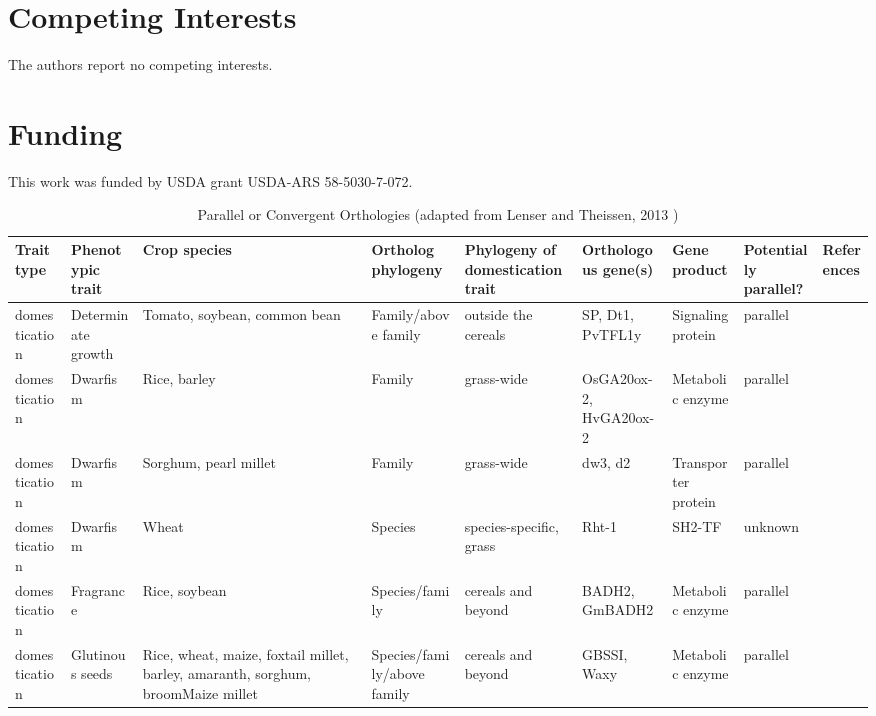\documentclass[12pt]{article}
\begin{document}
\section*{Competing Interests}
The authors report no competing interests.

\section*{Funding}
This work was funded by USDA grant USDA-ARS 58-5030-7-072.




\begin{table}
\begin{center}
\caption{Parallel or Convergent Orthologies (adapted from Lenser and Theissen, 2013 \citep{Lenser2013})} \label{tab:Ortho}
\fontsize{7}{8}\selectfont
\begin{tabular}{C{1.5cm}G{2.5cm}C{3.10cm}C{3.2cm}C{2.3cm}G{3.5cm}G{2.1cm}C{1.3cm}G{1.5cm}}
\\\toprule
{\bf Trait type} & {\bf Phenotypic trait} &{\bf Crop species} & {\bf Ortholog phylogeny} & {\bf Phylogeny of domestication trait} & {\bf Orthologous gene(s)} & {\bf Gene product} & {\bf Potentially parallel?} & {\bf References} \\\toprule
 domestication & Determinate growth &Tomato, soybean, common bean & Family/above family & outside the cereals & SP, Dt1, PvTFL1y & Signaling protein & parallel & \citep{Doebley2006, Repinski2012, Liu2010, Kwak2012, Tian2010}\\
 domestication & Dwarfism &Rice, barley & Family & grass-wide & OsGA20ox-2, HvGA20ox-2 & Metabolic enzyme & parallel & \citep{Asano2007, Asano2011, Jia2009}\\
 domestication & Dwarfism &Sorghum, pearl millet & Family & grass-wide & dw3, d2 & Transporter protein & parallel & \citep{Multani2003,Parvathaneni2013}\\
 domestication & Dwarfism &Wheat & Species & species-specific, grass & Rht-1 & SH2-TF & unknown & \citep{Doebley2006}\\
 domestication & Fragrance &Rice, soybean & Species/family & cereals and beyond & BADH2, GmBADH2 & Metabolic enzyme & parallel & \citep{Kovach2009, Juwattanasomran2010}\\
 domestication & Glutinous seeds &Rice, wheat, maize, foxtail millet, barley, amaranth, sorghum, broomMaize millet & Species/family/above family & cereals and beyond & GBSSI, Waxy & Metabolic enzyme & parallel & \cite{Jeon2010, Fan2008, Kawahigashi2013, Kawase2005, Hunt2012, Park2011}\\

\end{tabular}
\end{center}
\end{table}
\end{document}
